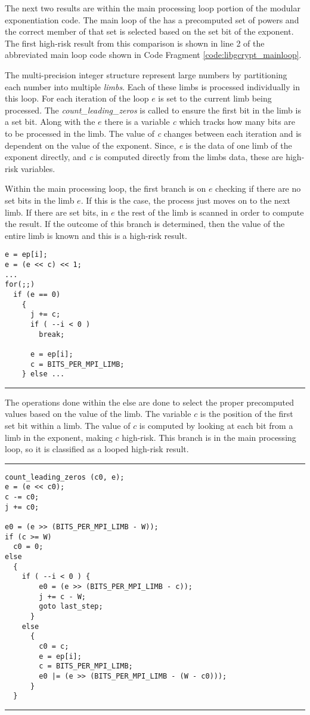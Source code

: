\documentclass[11pt,a4paper]{article}
\newcommand{\codevar}[1]{\textit{#1}}
\begin{document}
The next two results are within the main processing loop portion of the modular
exponentiation code. The main loop of the has a precomputed set of powers and
the correct member of that set is selected based on the set bit of the exponent.
The first high-risk result from this comparison is shown in line 2 of the
abbreviated main loop code shown in Code Fragment \ref{code:libgcrypt_mainloop}.

The multi-precision integer structure represent large numbers by partitioning
each number into multiple \textit{limbs}. Each of these limbs is
processed individually in this loop. For each iteration of the loop $e$ is set
to the current limb being processed. The \textit{count\_leading\_zeros}
is called to ensure the first bit in the limb is a set bit. Along with the $e$
there is a variable \codevar{c} which tracks how many bits are to be processed in the
limb. The value of \codevar{c} changes between each iteration and is dependent on the
value of the exponent. Since, \codevar{e} is the data of one limb of the exponent
directly, and \codevar{c} is computed directly from the limbs data, these are high-risk
variables.

Within the main processing loop, the first branch is on $e$ checking if there
are no set bits in the limb $e$. If this is the case, the process just moves on to the
next limb. If there are set bits, in $e$ the rest of the limb is scanned in
order to compute the result. If the outcome of this branch is determined, then
the value of the entire limb is known and this is a high-risk result.

\begin{lstlisting}[caption=Libgcrypt lines 609-626, label=code:libgcrypt_mainloop]
e = ep[i];
e = (e << c) << 1;
...
for(;;)
  if (e == 0)
    {
      j += c;
      if ( --i < 0 )
        break;

      e = ep[i];
      c = BITS_PER_MPI_LIMB;
    } else ...
\end{lstlisting}
\hrule
\vspace{5pt}


The operations done within the else are done to select the proper precomputed
values based on the value of the limb. The variable $c$ is the position of the
first set bit within a limb.  The value of $c$ is computed by looking
at each bit from a limb in the exponent, making $c$ high-risk. This
branch is in the main processing loop, so it is classified as a looped high-risk result.


\vspace{5pt}
\hrule
\begin{lstlisting}[caption=Libgcrypt lines 635-658]
count_leading_zeros (c0, e);
e = (e << c0);
c -= c0;
j += c0;

e0 = (e >> (BITS_PER_MPI_LIMB - W));
if (c >= W)
  c0 = 0;
else
  {
    if ( --i < 0 ) {
        e0 = (e >> (BITS_PER_MPI_LIMB - c));
        j += c - W;
        goto last_step;
      }
    else
      {
        c0 = c;
        e = ep[i];
        c = BITS_PER_MPI_LIMB;
        e0 |= (e >> (BITS_PER_MPI_LIMB - (W - c0)));
      }
  }
\end{lstlisting}
\hrule
\vspace{5pt}
\end{document}
